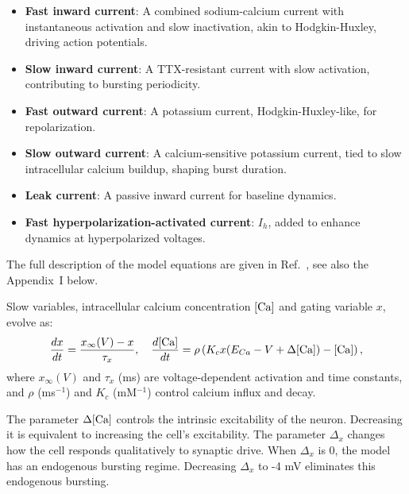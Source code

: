 \documentclass[nofootinbib,aip,amsmath,amssymb,reprint,twocolumn,10pt]{revtex4-2}
\begin{document}
\begin{itemize}
    \item \textbf{Fast inward current}: A combined sodium-calcium current with instantaneous activation and slow inactivation, akin to Hodgkin-Huxley, driving action potentials.

    \item \textbf{Slow inward current}: A TTX-resistant current with slow activation, contributing to bursting periodicity.
    \item \textbf{Fast outward current}: A potassium current, Hodgkin-Huxley-like, for repolarization.
    \item \textbf{Slow outward current}: A calcium-sensitive potassium current, tied to slow intracellular calcium buildup, shaping burst duration.
    \item \textbf{Leak current}: A passive inward current for baseline dynamics.
    \item \textbf{Fast hyperpolarization-activated current}: $I_h$, added to enhance dynamics at hyperpolarized voltages.
\end{itemize}

The full description of the model equations are given in Ref.~\cite{scully2024pairing}, see also the Appendix~I below.

Slow variables, intracellular calcium concentration $[\rm Ca]$ and gating variable $x$, evolve as:
\begin{equation}
\frac{dx}{dt} = \frac{x_\infty(V) - x}{\tau_x},\quad 
\frac{d[\rm Ca]}{dt} = \rho \left( K_c x (E_{Ca} - V + \Delta { [\rm Ca]}) - [\rm Ca] \right),
\end{equation}
where $x_\infty(V)$ and $\tau_x$ (ms) are voltage-dependent activation and time constants, and $\rho$ (ms$^{-1}$) and $K_c$ (mM$^{-1}$) control calcium influx and decay.

The parameter $\Delta { [\rm Ca]}$ controls the intrinsic excitability of the neuron. Decreasing it is equivalent to increasing the cell's excitability.
The parameter $\Delta _{x}$ changes how the cell responds qualitatively to synaptic drive. When $\Delta _{x}$ is 0, the model has an endogenous bursting regime. Decreasing $\Delta _{x}$ to -4 mV eliminates this endogenous bursting.
\end{document}
